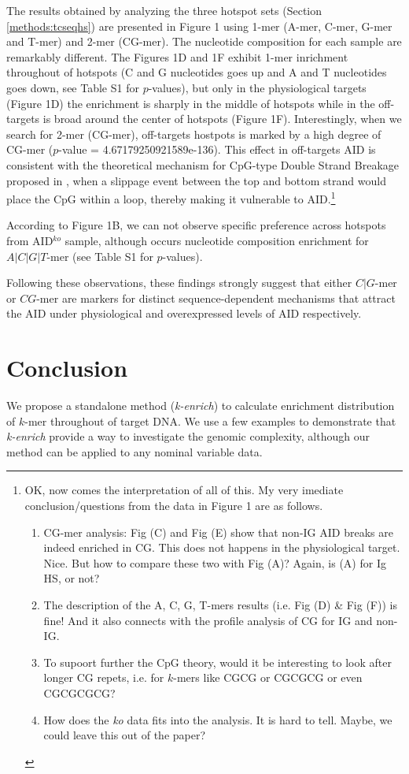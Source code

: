 \documentclass{bioinfo}
\begin{document}
The results obtained by analyzing the three hotspot sets (Section
\ref{methods:tcseqhs}) are presented in Figure 1 using 1-mer (A-mer, C-mer,
G-mer and T-mer) and 2-mer (CG-mer). The nucleotide composition for each
sample are remarkably different. The Figures 1D and 1F exhibit 1-mer
inrichment throughout of hotspots (C and G nucleotides goes up and A and T
nucleotides goes down, see Table S1 for $p$-values), but only in the
physiological targets (Figure 1D) the enrichment is sharply in the middle of
hotspots while in the off-targets is broad around the center of hotspots
(Figure 1F). Interestingly, when we search for 2-mer (CG-mer), off-targets
hostpots is marked by a high degree of CG-mer ($p$-value =
4.67179250921589e-136). This effect in off-targets AID is consistent with the theoretical mechanism for CpG-type Double Strand Breakage proposed in \cite{pmid19070581}, when a slippage event between the top and bottom strand would place the CpG within a loop, thereby making it vulnerable to AID.\footnote{OK, now comes the interpretation of all of this. My very imediate conclusion/questions from the data in Figure 1 are as follows.
\begin{enumerate}
\item CG-mer analysis: Fig (C) and Fig (E) show that non-IG AID breaks are indeed enriched in CG. This does not happens in the physiological target. Nice. But how to compare these two with Fig (A)? Again, is (A) for Ig HS, or not?
\item The description of the A, C, G, T-mers results (i.e. Fig (D) \& Fig (F)) is fine! And it also connects with the profile analysis of CG for IG and non-IG.
\item To supoort further the CpG theory, would it be interesting to look after longer CG repets, i.e. for $k$-mers like CGCG or CGCGCG or even CGCGCGCG?
\item How does the \emph{ko} data fits into the analysis. It is hard to tell. Maybe, we could leave this out of the paper?
\end{enumerate}}

According to Figure 1B, we can not observe specific preference across hotspots from AID$^{ko}$ sample, although occurs nucleotide composition enrichment for $A|C|G|T$-mer (see Table S1 for $p$-values).

Following these observations, these findings strongly suggest that either $C|G$-mer or $CG$-mer are markers for distinct sequence-dependent mechanisms that attract the AID under physiological and overexpressed levels of AID respectively.

\section{Conclusion}
We propose a standalone method ({\it k-enrich}) to calculate enrichment distribution of $k$-mer throughout of target DNA. We use a few examples to demonstrate that {\it k-enrich} provide a way to investigate the genomic complexity, although our method can be applied to any nominal variable data.



\scriptsize{
   
\normalsize
}
\end{document}
